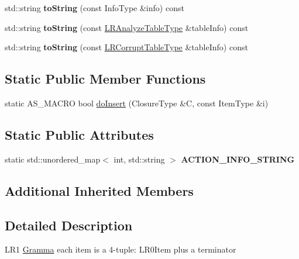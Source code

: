 \begin{DoxyCompactItemize}
\mbox{\label{classx2_1_1_l_r1_gramma_a5377a952f9b644679486562c1541ff47}} 
std\+::string {\bfseries to\+String} (const Info\+Type \&info) const
\item 
\mbox{\label{classx2_1_1_l_r1_gramma_afbbf6899bed1091fbc33df05a5e5993f}} 
std\+::string {\bfseries to\+String} (const \hyperlink{classx2_1_1_gramma_a33681053b045219ea58cc68c3faa4975}{L\+R\+Analyze\+Table\+Type} \&table\+Info) const
\item 
\mbox{\label{classx2_1_1_l_r1_gramma_a483fccba9ab1e14e7132d79b2cb80ab0}} 
std\+::string {\bfseries to\+String} (const \hyperlink{classx2_1_1_gramma_a03901eb5b196689b901fbf23e5bb9f0e}{L\+R\+Corrupt\+Table\+Type} \&table\+Info) const
\end{DoxyCompactItemize}
\subsection*{Static Public Member Functions}
\begin{DoxyCompactItemize}
\item 
static A\+S\+\_\+\+M\+A\+C\+RO bool \hyperlink{classx2_1_1_l_r1_gramma_a47cbb98b8eceeae4600067e29f4d67b6}{do\+Insert} (Closure\+Type \&C, const Item\+Type \&i)
\end{DoxyCompactItemize}
\subsection*{Static Public Attributes}
\begin{DoxyCompactItemize}
\item 
static std\+::unordered\+\_\+map$<$ int, std\+::string $>$ {\bfseries A\+C\+T\+I\+O\+N\+\_\+\+I\+N\+F\+O\+\_\+\+S\+T\+R\+I\+NG}
\end{DoxyCompactItemize}
\subsection*{Additional Inherited Members}


\subsection{Detailed Description}
L\+R1 \hyperlink{classx2_1_1_gramma}{Gramma} each item is a 4-\/tuple\+: L\+R0\+Item plus a terminator 

